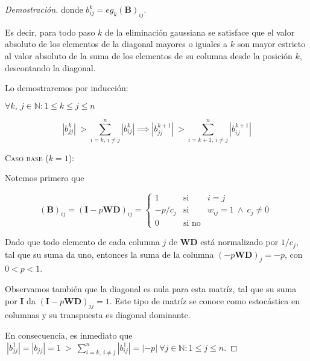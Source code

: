 \begin{proof}[Demostración]
\vspace{0.5em}
\noindent donde $b^k_{ij} = eg_k(\mathbf{B})_{ij}$.

\vspace{1em}
Es decir, para todo paso $k$ de la eliminación gaussiana se satisface que el valor absoluto de los elementos de la diagonal mayores o iguales a $k$ son mayor estricto al valor absoluto de la suma de los elementos de su columna desde la posición $k$, descontando la diagonal.

\vspace{1em}
\noindent Lo demostraremos por inducción:

\vspace{2em}
\noindent $\forall k,\ j \in \mathbb{N}: 1 \leq k \leq j \leq n$ 

\begin{equation*}
    |b^{k}_{jj}| \ > \sum_{i = k,\ i \neq j}^{n} |b^{k}_{ij}| \implies |b^{k+1}_{jj}| \ > \sum_{i = k+1,\ i \neq j}^{n} |b^{k+1}_{ij}|
\end{equation*}

\newpage
\noindent \textsc{Caso base} ($k = 1$):

\vspace{1em}
\noindent Notemos primero que 

\begin{equation*}
    (\mathbf{B})_{ij} = (\mathbf{I} - p\mathbf{W}\mathbf{D})_{ij} =
    \left\{ 
        \begin{array}{lcc}
            1           & \text{si} & i = j   \\
            -p / c_j    & \text{si} & w_{ij} = 1\ \wedge\ c_j \neq 0 \\
            0           & \text{si no}   
        \end{array}
    \right.\ 
\end{equation*}

\vspace{2em}
Dado que todo elemento de cada columna $j$ de $\mathbf{W}\mathbf{D}$ está normalizado por $1/c_j$, tal que su suma da uno, entonces la suma de la columna $(-p\mathbf{W}\mathbf{D})_{j} = -p$, con $0 < p < 1$.

\vspace{1em}
Observamos también que la diagonal es nula para esta matríz, tal que su suma por $\mathbf{I}$ da $(\mathbf{I} - p\mathbf{W}\mathbf{D})_{jj} = 1$. Este tipo de matríz se conoce como estocástica en columnas y su transpuesta es diagonal dominante. 

\vspace{1em}
\noindent En consecuencia, es inmediato que $\ |b^{1}_{jj}| = |b_{jj}| = 1\ >\ \sum_{i = k,\ i \neq j}^{n} |b^{1}_{ij}| = |-p|\ \forall j \in \mathbb{N}: 1 \leq j \leq n$. 


\end{proof}
